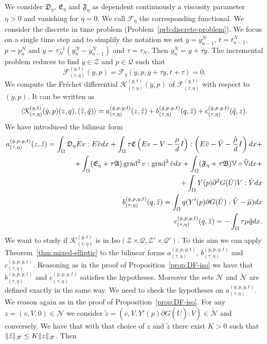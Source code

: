 We consider $\mathfrak{D}_\eta$, $\mathfrak{E}_\eta$ and $\mathfrak{F}_\eta$ as dependent continuously a viscosity parameter $\eta>0$ and vanishing for $\eta=0$. We call $\mathcal{F}_\eta$ the corresponding functional. We consider the discrete in time problem (Problem~\ref{prb:discrete-problem}). We focus on a single time step and to simplify the notation we set $y=y_{n-1}^N$, $t=t_{n-1}^N$, $p=p_n^N$ and $\dot y=\tau_N^{-1}(y_n^N-y_{n-1}^N)$ and $\tau=\tau_N$. Then $y_n^N=y+\tau\dot y$. The incremental problem reduces to find $\dot y\in\mathscr{Z}$ and $p\in\mathscr{Q}$ such that
\[
\mathcal{F}^{(y,t)}_{(\tau,\eta)}(\dot y,p)=\mathcal{F}_\eta(\dot y,p,y+\tau\dot y,t+\tau)=0.
\]
We compute the Fréchet differential $\mathcal{K}_{(\tau,\eta)}^{(y,t)}(\dot y,p)$ of $\mathcal{F}_{(\tau,\eta)}^{(y,t)}$ with respect to $(\dot y,p)$. It can be written as
\[
\langle\mathcal{K}_{(\tau,\eta)}^{(y,t)}(\dot y,p)(z,q),(\tilde z,\tilde q)\rangle=a_{(\tau,\eta)}^{(\dot y,p,y,t)}(z,\tilde z)+b_{(\tau,\eta)}^{(\dot y,p,y,t)}(q,\tilde z)+c_{(\tau,\eta)}^{(\dot y,p,y,t)}(\tilde q,z).
\]
We have introduced the bilinear form
\begin{align*}
\begin{split}
a_{(\tau,\eta)}^{(\dot y,p,y,t)}(z,\tilde z)=\int_\Omega\mathfrak{D}_\eta Ev:E\tilde vdx+\int_\Omega\tau\mathfrak{C}\left(Ev-V-\frac{\mu}{d}I\right):\left(E\tilde v-\tilde V-\frac{\tilde\mu}{d}I\right)dx+\\
+\int_\Omega(\mathfrak{E}_\eta+\tau\mathfrak{A})\operatorname{grad}^2v:\operatorname{grad}^2\tilde vdx+\int_\Omega(\mathfrak{F}_\eta+\tau\mathfrak{B})\mathbb{V}\circ\tilde{\mathbb{V}}dx+\\
+\int_\Omega Y(p)\partial^2 G(\dot U)V:\tilde Vdx
\end{split} & \\
\begin{split}
b_{(\tau,\eta)}^{(\dot y,p,y,t)}(q,\tilde z)=\int_\Omega q(Y'(p)\partial G(\dot U):\tilde V-\tilde\mu)dx
\end{split} & \\
\begin{split}
c_{(\tau,\eta)}^{(\dot y,p,y,t)}(q,\tilde z)=-\int_\Omega\tau\mu\tilde qdx.
\end{split}
\end{align*}
We want to study if $\mathscr{K}_{(\tau,\eta)}^{(y,t)}$ is in $\text{Iso}(\mathscr{Z}\times\mathscr{Q},\mathscr{Z}'\times\mathscr{Q}')$. To this aim we can apply Theorem~\ref{thm:mixed-elliptic} to the bilinear forms $a_{(\tau,\eta)}^{(\dot y,p,y,t)}$, $b_{(\tau,\eta)}^{(\dot y,p,y,t)}$ and $c_{(\tau,\eta)}^{(\dot y,p,y,t)}$. Reasoning as in the proof of Proposition~\ref{prop:DF-iso} we have that $b_{(\tau,\eta)}^{(\dot y,p,y,t)}$ and $c_{(\tau,\eta)}^{(\dot y,p,y,t)}$ satisfies the hypotheses. Moreover the sets $\mathscr{N}$ and $\tilde{\mathscr{N}}$ are defined exactly in the same way. We need to check the hypotheses on $a_{(\tau,\eta)}^{(\dot y,p,y,t)}$. We reason again as in the proof of Proposition~\ref{prop:DF-iso}. For any $z=(v,V,0)\in\mathscr{N}$ we consider $\tilde z=(v,V,Y'(p)\partial G(\dot U):V)\in\tilde{\mathscr{N}}$ and conversely. We have that with that choice of $z$ and $\tilde z$ there exist $K>0$ such that $\lVert\tilde z\rVert_\mathscr{Z}\le K\lVert z\rVert_\mathscr{Z}$. Then
